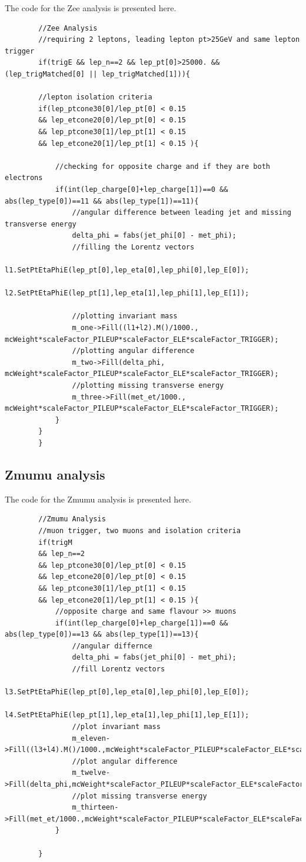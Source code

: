 \documentclass[runningheads,a4paper]{llncs}
\begin{document}
\fontsize{7}{5}\selectfont
The code for the Zee analysis is presented here.
\begin{verbatim}
		//Zee Analysis
		//requiring 2 leptons, leading lepton pt>25GeV and same lepton trigger
		if(trigE && lep_n==2 && lep_pt[0]>25000. && (lep_trigMatched[0] || lep_trigMatched[1])){
		
		//lepton isolation criteria
		if(lep_ptcone30[0]/lep_pt[0] < 0.15 
        && lep_etcone20[0]/lep_pt[0] < 0.15 
        && lep_ptcone30[1]/lep_pt[1] < 0.15 
        && lep_etcone20[1]/lep_pt[1] < 0.15 ){

			//checking for opposite charge and if they are both electrons
			if(int(lep_charge[0]+lep_charge[1])==0 && abs(lep_type[0])==11 && abs(lep_type[1])==11){
				//angular difference between leading jet and missing transverse energy
				delta_phi = fabs(jet_phi[0] - met_phi);
				//filling the Lorentz vectors
				l1.SetPtEtaPhiE(lep_pt[0],lep_eta[0],lep_phi[0],lep_E[0]);	
				l2.SetPtEtaPhiE(lep_pt[1],lep_eta[1],lep_phi[1],lep_E[1]);
				
				//plotting invariant mass
				m_one->Fill((l1+l2).M()/1000., mcWeight*scaleFactor_PILEUP*scaleFactor_ELE*scaleFactor_TRIGGER);
				//plotting angular difference
				m_two->Fill(delta_phi, mcWeight*scaleFactor_PILEUP*scaleFactor_ELE*scaleFactor_TRIGGER);
				//plotting missing transverse energy
				m_three->Fill(met_et/1000., mcWeight*scaleFactor_PILEUP*scaleFactor_ELE*scaleFactor_TRIGGER);	
			}
		}
		}
\end{verbatim}
\subsection{Zmumu analysis}

\fontsize{7}{5}\selectfont
The code for the Zmumu analysis is presented here.
\begin{verbatim}
		//Zmumu Analysis
		//muon trigger, two muons and isolation criteria
		if(trigM 
        && lep_n==2 
        && lep_ptcone30[0]/lep_pt[0] < 0.15 
        && lep_etcone20[0]/lep_pt[0] < 0.15 
        && lep_ptcone30[1]/lep_pt[1] < 0.15 
        && lep_etcone20[1]/lep_pt[1] < 0.15 ){
			//opposite charge and same flavour >> muons
			if(int(lep_charge[0]+lep_charge[1])==0 && abs(lep_type[0])==13 && abs(lep_type[1])==13){
				//angular differnce
				delta_phi = fabs(jet_phi[0] - met_phi);
				//fill Lorentz vectors
				l3.SetPtEtaPhiE(lep_pt[0],lep_eta[0],lep_phi[0],lep_E[0]);	
				l4.SetPtEtaPhiE(lep_pt[1],lep_eta[1],lep_phi[1],lep_E[1]);
				//plot invariant mass
				m_eleven->Fill((l3+l4).M()/1000.,mcWeight*scaleFactor_PILEUP*scaleFactor_ELE*scaleFactor_TRIGGER);
				//plot angular difference
				m_twelve->Fill(delta_phi,mcWeight*scaleFactor_PILEUP*scaleFactor_ELE*scaleFactor_TRIGGER);
				//plot missing transverse energy
				m_thirteen->Fill(met_et/1000.,mcWeight*scaleFactor_PILEUP*scaleFactor_ELE*scaleFactor_TRIGGER);	
			}

		}
\end{verbatim}
\end{document}
